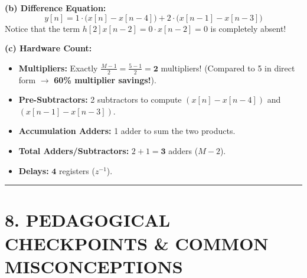 \documentclass[11pt,a4paper]{article}
\begin{document}
\vspace{0.2cm}
\noindent\textbf{(b) Difference Equation:}
\begin{equation}
y[n] = 1 \cdot \Big( x[n] - x[n-4] \Big) + 2 \cdot \Big( x[n-1] - x[n-3] \Big)
\end{equation}
Notice that the term $h[2] x[n-2] = 0 \cdot x[n-2] = 0$ is completely absent!

\vspace{0.2cm}
\noindent\textbf{(c) Hardware Count:}
\begin{itemize}
    \item \textbf{Multipliers:} Exactly $\frac{M-1}{2} = \frac{5-1}{2} = \mathbf{2}$ multipliers! (Compared to 5 in direct form $\to$ \textbf{60\% multiplier savings!}).
    \item \textbf{Pre-Subtractors:} 2 subtractors to compute $(x[n]-x[n-4])$ and $(x[n-1]-x[n-3])$.
    \item \textbf{Accumulation Adders:} 1 adder to sum the two products.
    \item \textbf{Total Adders/Subtractors:} $2 + 1 = \mathbf{3}$ adders ($M-2$).
    \item \textbf{Delays:} $\mathbf{4}$ registers ($z^{-1}$).
\end{itemize}

\noindent\rule{\textwidth}{0.5pt}

\section{8. PEDAGOGICAL CHECKPOINTS \& COMMON MISCONCEPTIONS}
\end{document}
